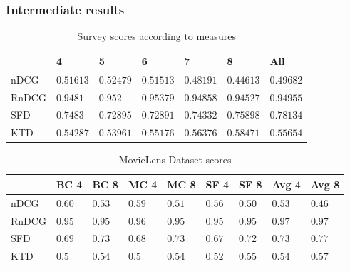 \begin{frame}
\frametitle{Intermediate results}
\begin{table}[H]
	\centering
	\begin{tabular}{|l|llllll|} \hline
		& 4 & 5 & 6 & 7 & 8 & All \\ \hline
		nDCG	& $0.51613$	& $0.52479$	& $0.51513$	& $0.48191$ & $0.44613$ & $0.49682$ \\
		RnDCG	& $0.9481$	& $0.952$	& $0.95379$	& $0.94858$ & $0.94527$ & $0.94955$ \\
		SFD	& $0.7483$	& $0.72895$	& $0.72891$	& $0.74332$ & $0.75898$ & $0.78134$ \\
		KTD	& $0.54287$	& $0.53961$	& $0.55176$	& $0.56376$ & $0.58471$ & $0.55654$ \\ \hline
	\end{tabular}
	\caption{Survey scores according to measures}
\end{table}

\begin{table}[H]
	\centering
	\begin{tabular}{|l|llllllll|} \hline
		& BC 4 & BC 8 & MC 4 & MC 8 & SF 4 & SF 8 & Avg 4 & Avg 8 \\ \hline
		nDCG	& $0.60$	& $0.53$	& $0.59$	& $0.51$ & $0.56$ & $0.50$ & $0.53$ & $0.46$ \\
		RnDCG	& $0.95$	& $0.95$	& $0.96$	& $0.95$ & $0.95$ & $0.95$ & $0.97$ & $0.97$ \\
		SFD	& $0.69$	& $0.73$	& $0.68$	& $0.73$ & $0.67$ & $0.72$ & $0.73$ & $0.77$ \\
		KTD	& $0.5$	& $0.54$	& $0.5$	& $0.54$ & $0.52$ & $0.55$ & $0.54$ & $0.57$\\ \hline
	\end{tabular}
	\caption{MovieLens Dataset scores}
\end{table}
\end{frame}

